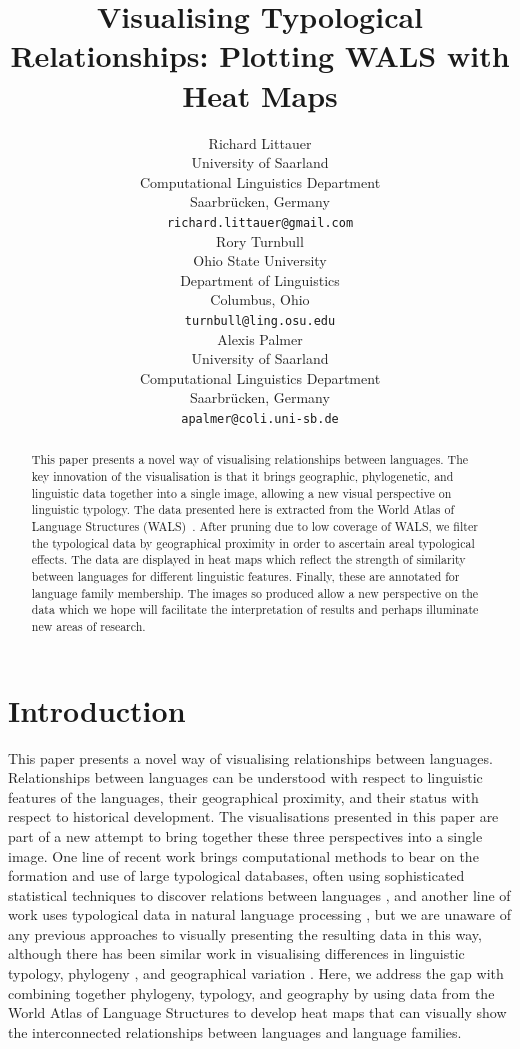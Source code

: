\documentclass[11pt]{article}
\title{Visualising Typological Relationships: Plotting WALS with Heat Maps}
\author{Richard Littauer \\
 University of Saarland\\
 Computational Linguistics Department\\
 Saarbr\"ucken, Germany\\
   {\tt richard.littauer@gmail.com} \\\And
 Rory Turnbull \\
 Ohio State University\\
 Department of Linguistics\\
 Columbus, Ohio\\
   {\tt turnbull@ling.osu.edu} \\\AND
 Alexis Palmer\\
 University of Saarland\\
 Computational Linguistics Department\\
 Saarbr\"ucken, Germany\\
   {\tt apalmer@coli.uni-sb.de}\\}
\date{}
\begin{document}
\maketitle

\begin{abstract}
This paper presents a novel way of visualising relationships between languages. The key innovation of the visualisation is that it brings geographic, phylogenetic, and linguistic data together into a single image, allowing a new visual perspective on linguistic typology. The data presented here is extracted from the World Atlas of Language Structures (WALS)~\cite{wals-2011}. After pruning due to low coverage of WALS, we filter the typological data by geographical proximity in order to ascertain areal typological effects. The data are displayed in heat maps which reflect the strength of similarity between languages for different linguistic features. Finally, these are annotated for language family membership. The images so produced allow a new perspective on the data which we hope will facilitate the interpretation of results and perhaps illuminate new areas of research.
\end{abstract}

\section{Introduction}
This paper presents a novel %
way of visualising relationships between languages. Relationships between languages can be understood with respect to linguistic features of the languages, their geographical proximity, and their status with respect to historical development. The visualisations presented in this paper are part of a new attempt %
to bring together these three perspectives into a single image. One line of recent work brings computational methods to bear on the formation and use of large typological databases, often using sophisticated statistical techniques to discover relations between languages \cite[among others]{cysouw2011,daume07implication,daume09areal}, and another line of work uses typological data in natural language processing \cite[for example]{georgi:etal:10,lewis:xia:08}, but we are unaware of any previous approaches to visually presenting the resulting data in this way, although there has been similar work \cite{mayer:etal:2010,rohrdantz:etal:2010} in visualising differences in linguistic typology, phylogeny \cite{multitree}%
, and geographical variation \cite{10.1371/journal.pone.0023613}. %
 Here, we address the gap with combining together phylogeny, typology, and geography %
 by using data from the World Atlas of Language Structures \cite{wals-2011} to develop heat maps that can visually show the interconnected relationships between languages and language families. 
\end{document}
